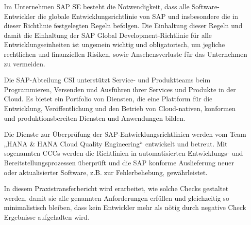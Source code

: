 \documentclass[../main.tex]{subfiles}
\begin{document}
Im Unternehmen SAP SE besteht die Notwendigkeit, dass alle Software-Entwickler die globale Entwicklungsrichtlinie von SAP und insbesondere die in dieser Richtlinie festgelegten Regeln befolgen. 
Die Einhaltung dieser Regeln und damit die Einhaltung der SAP Global Development-Richtlinie für alle Entwicklungseinheiten ist ungemein wichtig und obligatorisch, um jegliche rechtlichen und finanziellen Risiken, sowie Ansehensverluste für das Unternehmen zu vermeiden.

Die SAP-Abteilung \gls{CSI} unterstützt Service- und Produktteams beim Programmieren, Versenden und Ausführen ihrer Services und Produkte in der Cloud.
Es bietet ein Portfolio von Diensten, die eine Plattform für die Entwicklung, Veröffentlichung und den Betrieb von Cloud-nativen, konformen und produktionsbereiten Diensten und Anwendungen bilden.

Die Dienste zur Überprüfung der SAP-Entwicklungsrichtlinien werden vom Team „HANA \& HANA Cloud Quality Engineering“ entwickelt und betreut.
Mit sogenannten \glspl{CCC} werden die Richtlinien in automatisierten Entwicklungs- und Bereitstellungsprozessen überprüft und die SAP konforme Auslieferung neuer oder aktualisierter Software, z.B. zur Fehlerbehebung, gewährleistet. 

In diesem Praxistransferbericht wird erarbeitet, wie solche Checks gestaltet werden, damit sie alle genannten Anforderungen erfüllen und gleichzeitig so minimalistisch bleiben, dass kein Entwickler mehr als nötig durch negative Check Ergebnisse aufgehalten wird. 
\end{document}
